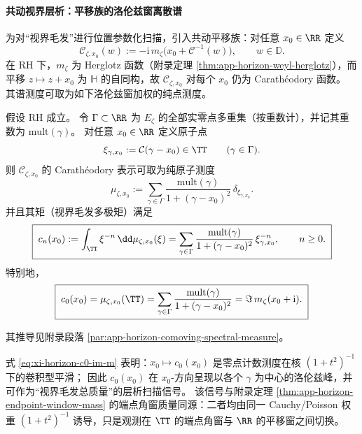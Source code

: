 \paragraph{共动视界层析：平移族的洛伦兹窗离散谱}
为对“视界毛发”进行位置参数化扫描，引入共动平移族：对任意 \(x_0\in\RR\) 定义
\begin{equation}\label{eq:xi-horizon-comoving-carath-def}
\boxed{\;
\mathscr{C}_{\zeta,x_0}(w):=-\mathrm{i}\,m_{\zeta}\!\bigl(x_0+\mathcal{C}^{-1}(w)\bigr),
\qquad w\in\mathbb{D}.
\;}
\end{equation}
在 RH 下，\(m_{\zeta}\) 为 Herglotz 函数（附录定理 \ref{thm:app-horizon-weyl-herglotz}），而平移 \(z\mapsto z+x_0\) 为 \(\mathbb{H}\) 的自同构，故 \(\mathscr{C}_{\zeta,x_0}\) 对每个 \(x_0\) 仍为 Carath\'eodory 函数。
其谱测度可取为如下洛伦兹窗加权的纯点测度。

\begin{theorem}[共动视界层析的离散谱测度与矩恒等式]\label{thm:xi-horizon-comoving-spectral-measure}
假设 RH 成立。
令 \(\Gamma\subset\RR\) 为 \(E_{\zeta}\) 的全部实零点多重集（按重数计），并记其重数为 \(\mathrm{mult}(\gamma)\)。
对任意 \(x_0\in\RR\) 定义原子点
\[
  \xi_{\gamma,x_0}:=\mathcal{C}(\gamma-x_0)\in\TT\qquad(\gamma\in\Gamma).
\]
则 \(\mathscr{C}_{\zeta,x_0}\) 的 Carath\'eodory 表示可取为纯原子测度
\begin{equation}\label{eq:xi-horizon-mu-comoving}
\boxed{\;
\mu_{\zeta,x_0}
:=
\sum_{\gamma\in\Gamma}\frac{\mathrm{mult}(\gamma)}{1+(\gamma-x_0)^2}\,\delta_{\xi_{\gamma,x_0}}.
\;}
\end{equation}
并且其矩（视界毛发多极矩）满足
\begin{equation}\label{eq:xi-horizon-moment-comoving}
\boxed{\;
c_n(x_0):=\int_{\TT}\xi^{-n}\,\dd\mu_{\zeta,x_0}(\xi)
=\sum_{\gamma\in\Gamma}\frac{\mathrm{mult}(\gamma)}{1+(\gamma-x_0)^2}\,\xi_{\gamma,x_0}^{-n},
\qquad n\ge 0.
\;}
\end{equation}
特别地，
\begin{equation}\label{eq:xi-horizon-c0-im-m}
\boxed{\;
c_0(x_0)=\mu_{\zeta,x_0}(\TT)
=\sum_{\gamma\in\Gamma}\frac{\mathrm{mult}(\gamma)}{1+(\gamma-x_0)^2}
=\Im\,m_{\zeta}(x_0+\mathrm{i}).\;}
\end{equation}
\end{theorem}
\noindent
其推导见附录段落 \ref{par:app-horizon-comoving-spectral-measure}。

\begin{remark}[洛伦兹窗平滑与层析语义]\label{rem:xi-horizon-lorentz-tomography}
式 \eqref{eq:xi-horizon-c0-im-m} 表明：\(x_0\mapsto c_0(x_0)\) 是零点计数测度在核 \((1+t^2)^{-1}\) 下的卷积型平滑；
因此 \(c_0(x_0)\) 在 \(x_0\)-方向呈现以各个 \(\gamma\) 为中心的洛伦兹峰，并可作为“视界毛发总质量”的层析扫描信号。
该信号与附录定理 \ref{thm:app-horizon-endpoint-window-mass} 的端点角窗质量同源：二者均由同一 Cauchy/Poisson 权重 \((1+t^2)^{-1}\) 诱导，只是观测在 \(\TT\) 的端点角窗与 \(\RR\) 的平移窗之间切换。
\end{remark}

